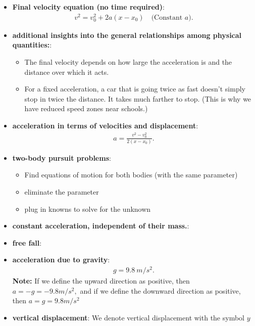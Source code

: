 \documentclass{report}
\begin{document}
\begin{itemize}
\begin{itemize}
            \end{itemize}
        \item \textbf{Final velocity equation (no time required)}:
            \begin{align*}
                v^{2} = v_{0}^{2} + 2a(x-x_{0}) \quad \text{(Constant $a$)}
            .\end{align*}
        \item \textbf{additional insights into the general relationships among physical quantities:}:
            \begin{itemize}
                \item The final velocity depends on how large the acceleration is and the distance over which it acts.
                \item For a fixed acceleration, a car that is going twice as fast doesn’t simply stop in twice the distance. It takes much farther to stop. (This is why we have reduced speed zones near schools.)
            \end{itemize}
        \item \textbf{acceleration in terms of velocities and displacement}:
            \begin{align*}
                a  = \frac{v^{2} - v_{0}^{2}}{2(x-x_{0})}
            .\end{align*}
        \item \textbf{two-body pursuit problems}:
            \begin{itemize}
                \item Find equations of motion for both bodies (with the same parameter)
                \item eliminate the parameter
                \item plug in knowns to solve for the unknown
            \end{itemize}
        \item \textbf{constant acceleration, independent of their mass.}: 
        \item \textbf{free fall}:
        \item \textbf{acceleration due to gravity}:
            \begin{align*}
                g = 9.8\ m/s^{2}
            .\end{align*}
            \textbf{Note:} If we define the upward direction as positive, then   $a=−g=-9.8m/s^{2},$ and if we define the downward direction as positive, then  $a=g=9.8m/s^{2}$
        \item \textbf{vertical displacement}: We denote vertical displacement with the symbol $y$

\end{itemize}
\end{document}
